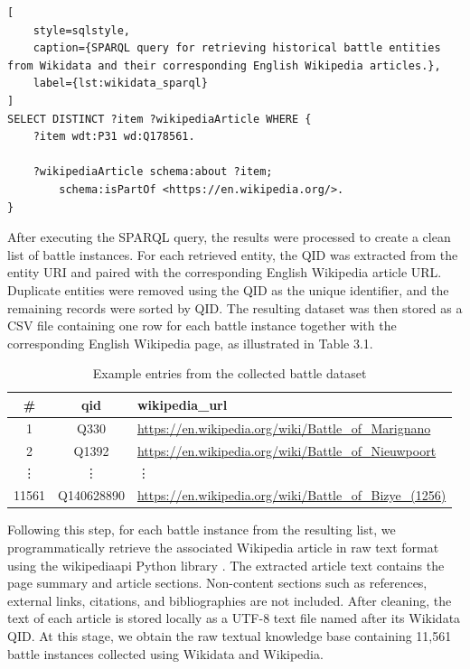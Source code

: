 \begin{minipage}{\textwidth}
\begin{lstlisting}[
    style=sqlstyle,
    caption={SPARQL query for retrieving historical battle entities from Wikidata and their corresponding English Wikipedia articles.},
    label={lst:wikidata_sparql}
]
SELECT DISTINCT ?item ?wikipediaArticle WHERE {
    ?item wdt:P31 wd:Q178561.

    ?wikipediaArticle schema:about ?item;
        schema:isPartOf <https://en.wikipedia.org/>.
}
\end{lstlisting}
\end{minipage}

After executing the SPARQL query, the results were processed to create a clean list of battle instances. For each retrieved entity, the QID was extracted from the entity URI and paired with the corresponding English Wikipedia article URL. Duplicate entities were removed using the QID as the unique identifier, and the remaining records were sorted by QID. The resulting dataset was then stored as a CSV file containing one row for each battle instance together with the corresponding English Wikipedia page, as illustrated in Table 3.1.
\begin{table}[htbp]
    \centering
    \caption{Example entries from the collected battle dataset}
    \label{tab:battle_dataset}
    \begin{tabular}{c c l}
        \toprule
        \textbf{\#} & \textbf{qid} & \textbf{wikipedia\_url} \\
        \midrule
        1 & Q330 & \url{https://en.wikipedia.org/wiki/Battle_of_Marignano} \\
        2 & Q1392 & \url{https://en.wikipedia.org/wiki/Battle_of_Nieuwpoort} \\
        \vdots & \vdots & \vdots \\
        11561 & Q140628890 & \url{https://en.wikipedia.org/wiki/Battle_of_Bizye_(1256)} \\
        \bottomrule
    \end{tabular}
\end{table}

Following this step, for each battle instance from the resulting list, we programmatically retrieve the associated Wikipedia article in raw text format using the wikipediaapi Python library \citep{wikipediaapi}. The extracted article text contains the page summary and article sections. Non-content sections such as references, external links, citations, and bibliographies are not included. After cleaning, the text of each article is stored locally as a UTF-8 text file named after its Wikidata QID. At this stage, we obtain the raw textual knowledge base containing 11,561 battle instances collected using Wikidata and Wikipedia.
